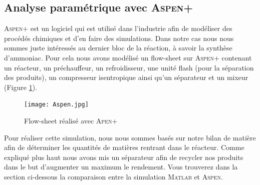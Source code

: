 \subsection{Analyse paramétrique avec \textsc{Aspen+}}
\textsc{Aspen+} est un logiciel qui est utilisé dans l'industrie afin de modéliser des procédés 
chimiques et d'en faire des simulations. Dans notre cas nous nous sommes juste intéressés au dernier bloc de la réaction, 
à savoir la synthèse d'ammoniac. Pour cela nous avons modélisé un flow-sheet sur \textsc{Aspen+} contenant un réacteur, un 
préchauffeur, un refroidisseur, une unité flash (pour la séparation des produits), un compresseur isentropique ainsi qu'un 
séparateur et un mixeur (Figure \ref{Aspen}).

\begin{figure}[ht!]
 \centering
 \texttt{[image: Aspen.jpg]}
 \caption{Flow-sheet réalisé avec \textsc{Apen+}}
 \label{Aspen}
\end{figure}

Pour réaliser cette simulation, nous nous sommes basés sur notre bilan de matière afin de déterminer les quantités de matières
rentrant dans le réacteur. Comme expliqué plus haut nous avons mis un séparateur afin de recycler nos produits dans le but 
d'augmenter un maximum le rendement. Vous trouverez dans la section ci-dessous la comparaison entre la simulation \textsc{Matlab} 
et \textsc{Aspen}.



